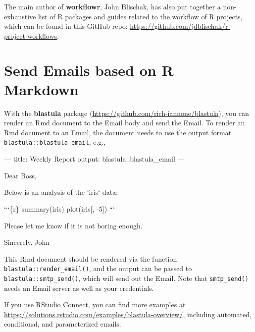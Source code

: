 \documentclass[
  11pt,
]{krantz}
\newenvironment{Shaded}{\begin{snugshade}}{\end{snugshade}}
\newcommand{\BaseNTok}[1]{\textcolor[rgb]{0.06,0.06,0.06}{#1}}
\newcommand{\NormalTok}[1]{#1}
\begin{document}
The main author of \textbf{workflowr}, John Blischak, has also put together a non-exhaustive list of R packages and guides related to the workflow of R projects, which can be found in this GitHub repo: \url{https://github.com/jdblischak/r-project-workflows}.

\hypertarget{blastula-email}{%
\section{Send Emails based on R Markdown}\label{blastula-email}}

With the \textbf{blastula} package (\url{https://github.com/rich-iannone/blastula}), you can render an Rmd document to the Email body and send the Email. To render an Rmd document to an Email, the document needs to use the output format \texttt{blastula::blastula\_email}, e.g.,

\begin{Shaded}
\begin{Highlighting}[]
\NormalTok{---}
\NormalTok{title: Weekly Report}
\NormalTok{output: blastula::blastula_email}
\NormalTok{--- }

\NormalTok{Dear Boss,}

\NormalTok{Below is an analysis of the }\BaseNTok{`iris`}\NormalTok{ data:}

\BaseNTok{```\{r\}}
\BaseNTok{summary(iris)}
\BaseNTok{plot(iris[, -5])}
\BaseNTok{```}

\NormalTok{Please let me know if it is not boring enough.}

\NormalTok{Sincerely,  }
\NormalTok{John}
\end{Highlighting}
\end{Shaded}

This Rmd document should be rendered via the function \texttt{blastula::render\_email()}, and the output can be passed to \texttt{blastula::smtp\_send()}, which will send out the Email. Note that \texttt{smtp\_send()} needs an Email server as well as your credentials.

If you use RStudio Connect, you can find more examples at \url{https://solutions.rstudio.com/examples/blastula-overview/}, including automated, conditional, and parameterized emails.

\backmatter

  

\printindex
\end{document}
